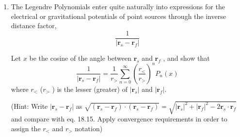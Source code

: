 \documentclass[fleqn]{article}
\begin{document}
\begin{enumerate}
    \item The Legendre Polynomials enter quite naturally into expressions for the electrical or gravitational potentials of
    point sources through the inverse distance factor,
    \begin{equation}
    \frac{1}{| {\mathbf r}_s -{\mathbf r}_f |}
    \end{equation}

    Let $x$ be the cosine of the angle between ${\mathbf r}_s$ and ${\mathbf r}_f$ , and show that
    \begin{equation}
    \frac{1}{| {\mathbf r}_s -{\mathbf r}_f |} = \frac{1}{r_{>}} \sum^{\infty}_{n=0} \left( \frac{r_{<}}{r_{>}}\right)^n P_n(x)
    \end{equation}
    where $r_{<}$ ($ r_{>}$ ) is the lesser (greater) of $|{\mathbf r}_s|$ and $|{\mathbf r}_f|$.

    (Hint: Write $| {\mathbf r}_s -{\mathbf r}_f |$ as $\sqrt{({\mathbf r}_s -{\mathbf r}_f )\cdot ({\mathbf r}_s -{\mathbf r}_f )}=\sqrt{|{\mathbf r}_s|^2 +|{\mathbf r}_f |^2 -2 {\mathbf r}_s \cdot {\mathbf r}_f }$ and compare with eq. 18.15. Apply convergence requirements in order to assign the  $r_{<}$ and  $ r_{>}$ notation) 


\end{enumerate}
\end{document}
